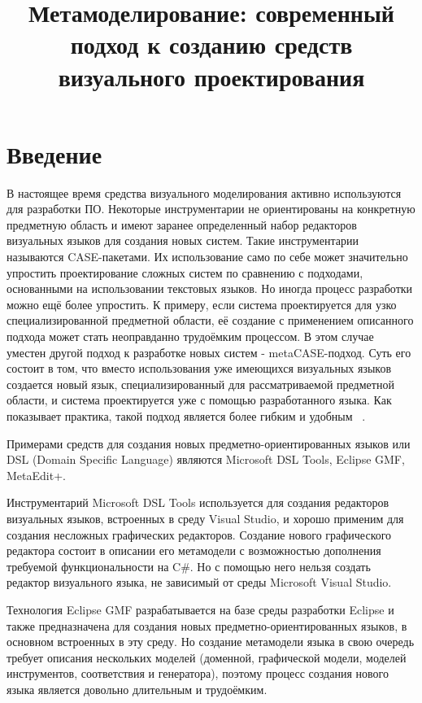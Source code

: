 \documentclass[a4paper]{article}
\title{Метамоделирование: современный подход к созданию средств визуального проектирования}
\date{}
\begin{document}
\maketitle
\thispagestyle{empty}

\section*{Введение}
В настоящее время средства визуального моделирования активно используются для разработки ПО. Некоторые инструментарии не ориентированы на конкретную предметную область и имеют заранее определенный набор редакторов визуальных языков для создания новых систем. Такие инструментарии называются CASE-пакетами. Их использование само по себе может значительно упростить проектирование сложных систем по сравнению с подходами, основанными на использовании текстовых языков. Но иногда процесс разработки можно ещё более упростить. К примеру, если система проектируется для узко специализированной предметной области, её создание с применением описанного подхода может стать неоправданно трудоёмким процессом. В этом случае уместен другой подход к разработке новых систем - metaCASE-подход. Суть его состоит в том, что вместо использования уже имеющихся визуальных языков создается новый язык, специализированный для рассматриваемой предметной области, и система проектируется уже с помощью разработанного языка. Как показывает практика, такой подход является более гибким и удобным ~\cite{Kieburtz}.

Примерами средств для создания новых предметно-ориентированных языков или DSL (Domain Specific Language) являются Microsoft DSL Tools, Eclipse GMF, MetaEdit+.

Инструментарий Microsoft DSL Tools используется для создания редакторов визуальных языков, встроенных в среду Visual Studio, и хорошо применим для создания несложных графических редакторов. Создание нового графического редактора состоит в описании его метамодели с возможностью дополнения требуемой функциональности на C\#. Но с помощью него нельзя создать редактор визуального языка, не зависимый от среды Microsoft Visual Studio.

Технология Eclipse GMF разрабатывается на базе среды разработки Eclipse и также предназначена для создания новых предметно-ориентированных языков, в основном встроенных в эту среду. Но создание метамодели языка в свою очередь требует описания нескольких моделей (доменной, графической модели, моделей инструментов, соответствия и генератора), поэтому процесс создания нового языка является довольно длительным и трудоёмким.
\end{document}
